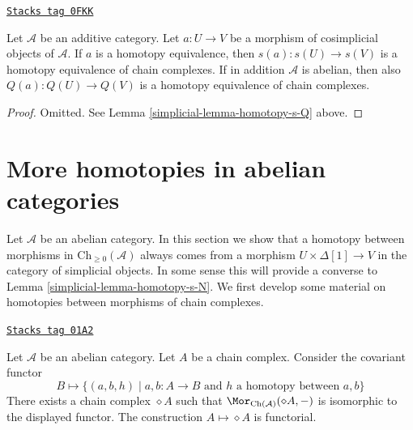 \begin{lemma}
\label{simplicial-lemma-homotopy-equivalence-s-Q}
\href{https://stacks.math.columbia.edu/tag/0FKK}{\texttt{Stacks tag 0FKK}}

Let $\mathcal{A}$ be an additive category. Let $a : U \to V$ be a morphism
of cosimplicial objects of $\mathcal{A}$. If $a$ is a homotopy equivalence,
then $s(a) : s(U) \to s(V)$ is a homotopy equivalence of chain complexes.
If in addition $\mathcal{A}$ is abelian, then also
$Q(a) : Q(U) \to Q(V)$ is a homotopy equivalence of chain complexes.
\end{lemma}

\begin{proof}

Omitted. See Lemma \ref{simplicial-lemma-homotopy-s-Q} above.
\end{proof}

\section{More homotopies in abelian categories}
\label{simplicial-section-backwards-homotopy}
Let $\mathcal{A}$ be an abelian category.
In this section we show that a homotopy between
morphisms in $\text{Ch}_{\geq 0}(\mathcal{A})$
always comes from a morphism $U \times \Delta[1] \to V$
in the category of simplicial objects. In some sense
this will provide a converse to Lemma \ref{simplicial-lemma-homotopy-s-N}.
We first develop some material on homotopies between morphisms
of chain complexes.

\begin{lemma}
\label{simplicial-lemma-represent-homotopy}
\href{https://stacks.math.columbia.edu/tag/01A2}{\texttt{Stacks tag 01A2}}

Let $\mathcal{A}$ be an abelian category. Let $A$ be a chain complex.
Consider the covariant functor
$$
B \longmapsto
\{
(a, b, h)
\mid
a, b : A \to B\text{ and }h\text{ a homotopy between }a, b
\}
$$
There exists a chain complex $\diamond A$
such that $\Mor_{\text{Ch}(\mathcal{A})}(\diamond A, -)$
is isomorphic to the displayed functor.
The construction $A \mapsto \diamond A$ is functorial.
\end{lemma}

